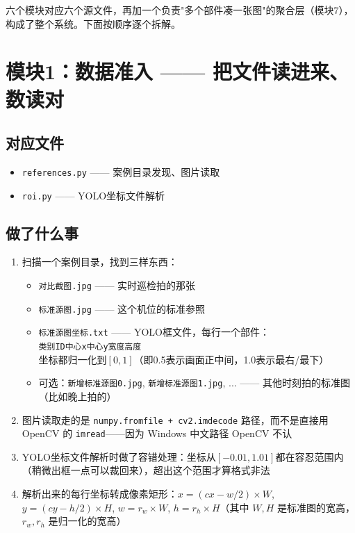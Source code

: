 \documentclass[12pt,a4paper]{ctexart}
\begin{document}
六个模块对应六个源文件，再加一个负责"多个部件凑一张图"的聚合层（模块7），构成了整个系统。下面按顺序逐个拆解。


\section{模块1：数据准入 —— 把文件读进来、数读对}

\subsection*{对应文件}
\begin{itemize}
\item \texttt{references.py} —— 案例目录发现、图片读取
\item \texttt{roi.py} —— YOLO坐标文件解析
\end{itemize}

\subsection*{做了什么事}

\begin{enumerate}
\item 扫描一个案例目录，找到三样东西：
  \begin{itemize}
  \item \texttt{对比截图.jpg} —— 实时巡检拍的那张
  \item \texttt{标准源图.jpg} —— 这个机位的标准参照
  \item \texttt{标准源图坐标.txt} —— YOLO框文件，每行一个部件：\\[2pt]
    \texttt{类别ID\qquad 中心x\qquad 中心y\qquad 宽度\qquad 高度}\\[2pt]
    坐标都归一化到$[0,1]$（即0.5表示画面正中间，1.0表示最右/最下）
  \item 可选：\texttt{新增标准源图0.jpg}, \texttt{新增标准源图1.jpg}, ... —— 其他时刻拍的标准图（比如晚上拍的）
  \end{itemize}
\item 图片读取走的是 \texttt{numpy.fromfile + cv2.imdecode} 路径，而不是直接用 OpenCV 的 \texttt{imread}——因为 Windows 中文路径 OpenCV 不认
\item YOLO坐标文件解析时做了容错处理：坐标从$[-0.01, 1.01]$都在容忍范围内（稍微出框一点可以裁回来），超出这个范围才算格式非法
\item 解析出来的每行坐标转成像素矩形：$x = (cx - w/2) \times W$, $y = (cy - h/2)\times H$, $w = r_w \times W$, $h = r_h \times H$（其中 $W, H$ 是标准图的宽高，$r_w, r_h$ 是归一化的宽高）
\end{enumerate}
\end{document}
